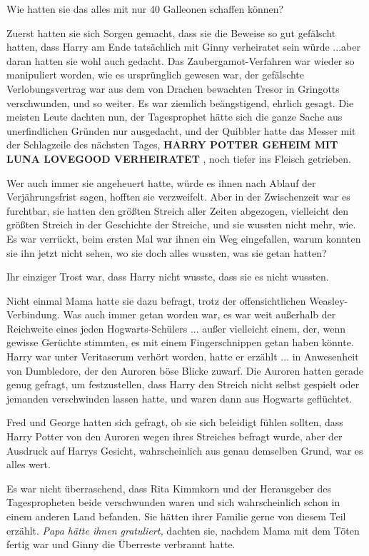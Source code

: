 Wie hatten sie das alles mit nur 40 Galleonen schaffen können?

Zuerst hatten sie sich Sorgen gemacht, dass sie die Beweise so gut gefälscht
hatten, dass Harry am Ende tatsächlich mit Ginny verheiratet sein würde ...aber
daran hatten sie wohl auch gedacht. Das Zaubergamot-Verfahren war wieder so
manipuliert worden, wie es ursprünglich gewesen war, der gefälschte
Verlobungsvertrag war aus dem von Drachen bewachten Tresor in Gringotts
verschwunden, und so weiter. Es war ziemlich beängstigend, ehrlich gesagt. Die
meisten Leute dachten nun, der Tagesprophet hätte sich die ganze Sache aus
unerfindlichen Gründen nur ausgedacht, und der Quibbler hatte das Messer mit der
Schlagzeile des nächsten Tages, \textbf{HARRY POTTER GEHEIM MIT LUNA LOVEGOOD
VERHEIRATET} , noch tiefer ins Fleisch getrieben.

Wer auch immer sie angeheuert hatte, würde es ihnen nach Ablauf der
Verjährungsfrist sagen, hofften sie verzweifelt. Aber in der Zwischenzeit war es
furchtbar, sie hatten den größten Streich aller Zeiten abgezogen, vielleicht den
größten Streich in der Geschichte der Streiche, und sie wussten nicht mehr, wie.
Es war verrückt, beim ersten Mal war ihnen ein Weg eingefallen, warum konnten
sie ihn jetzt nicht sehen, wo sie doch alles wussten, was sie getan hatten?

Ihr einziger Trost war, dass Harry nicht wusste, dass sie es nicht wussten.

Nicht einmal Mama hatte sie dazu befragt, trotz der offensichtlichen
Weasley-Verbindung. Was auch immer getan worden war, es war weit außerhalb der
Reichweite eines jeden Hogwarts-Schülers ... außer vielleicht einem, der, wenn
gewisse Gerüchte stimmten, es mit einem Fingerschnippen getan haben könnte.
Harry war unter Veritaserum verhört worden, hatte er erzählt ... in Anwesenheit
von Dumbledore, der den Auroren böse Blicke zuwarf. Die Auroren hatten gerade
genug gefragt, um festzustellen, dass Harry den Streich nicht selbst gespielt
oder jemanden verschwinden lassen hatte, und waren dann aus Hogwarts geflüchtet.

Fred und George hatten sich gefragt, ob sie sich beleidigt fühlen sollten, dass
Harry Potter von den Auroren wegen ihres Streiches befragt wurde, aber der
Ausdruck auf Harrys Gesicht, wahrscheinlich aus genau demselben Grund, war es
alles wert.

Es war nicht überraschend, dass Rita Kimmkorn und der Herausgeber des
Tagespropheten beide verschwunden waren und sich wahrscheinlich schon in einem
anderen Land befanden. Sie hätten ihrer Familie gerne von diesem Teil erzählt.
\emph{Papa hätte ihnen gratuliert,} dachten sie, nachdem Mama mit dem Töten fertig
war und Ginny die Überreste verbrannt hatte.

